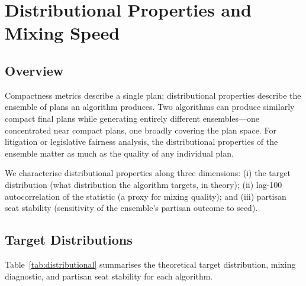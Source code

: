 \section{Distributional Properties and Mixing Speed}
\label{sec:distributional}

\subsection{Overview}

Compactness metrics describe a single plan; distributional properties
describe the ensemble of plans an algorithm produces.
Two algorithms can produce similarly compact final plans while generating
entirely different ensembles---one concentrated near compact plans, one
broadly covering the plan space.
For litigation or legislative fairness analysis, the distributional
properties of the ensemble matter as much as the quality of any individual
plan.

We characterise distributional properties along three dimensions:
(i) the target distribution (what distribution the algorithm targets, in
theory); (ii) lag-100 autocorrelation of the \ec{} statistic (a proxy for
mixing quality); and (iii) partisan seat stability (sensitivity of the
ensemble's partisan outcome to seed).

\subsection{Target Distributions}

Table~\ref{tab:distributional} summarises the theoretical target
distribution, mixing diagnostic, and partisan seat stability for each
algorithm.

